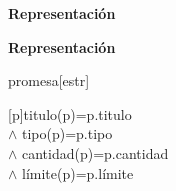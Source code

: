 \documentclass[10pt, a4paper]{article}
\newenvironment{Representacion}{%
  \vspace*{2ex}%
  \noindent\textbf{\Large Representaci\'{o}n}%
  \vspace*{2ex}%
}{}
\newcommand{\Title}[1]{
  \vspace*{1ex}\par\noindent\textbf{\large #1}\par
}
\begin{document}
\begin{Representacion}
 \Title{Representaci\'{o}n}
    \begin{Estructura}{promesa}[estr]
    \begin{Tupla}[promesa] 
    \end{Tupla} 
    \end{Estructura}
      \mbox{}
      [p]{titulo(p)=p.titulo\\$\wedge$ tipo(p)=p.tipo \\$\wedge$ cantidad(p)=p.cantidad\\$\wedge$ l\'{i}mite(p)=p.l\'{i}mite}
      
\end{Representacion}
\end{document}
